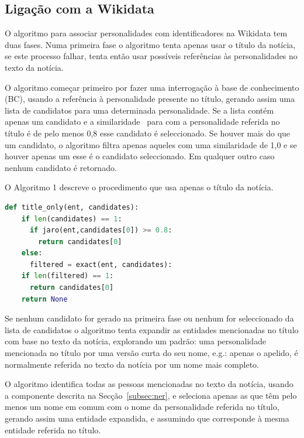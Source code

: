 \documentclass[a4paper, twocolumn, 11pt, twoside]{article}
\begin{document}
\subsection{Ligação com a Wikidata}
\label{subsec:ent_linking}

O algoritmo para associar personalidades com identificadores na Wikidata tem duas fases. Numa primeira fase o algoritmo tenta apenas usar o título da notícia, se este processo falhar, tenta então usar possíveis referências às personalidades no texto da notícia.

O algoritmo começar primeiro por fazer uma interrogação à base de conhecimento (BC), usando a referência à personalidade presente no título, gerando assim uma lista de candidatos para uma determinada personalidade. Se a lista contém apenas um candidato e a similaridade~\citep{jaro1989} para com a personalidade referida no título é de pelo menos 0,8 esse candidato é seleccionado. Se houver mais do que um candidato, o algoritmo filtra apenas aqueles com uma similaridade de 1,0 e se houver apenas um esse é o candidato seleccionado. Em qualquer outro caso nenhum candidato é retornado. 

O Algoritmo 1 descreve o procedimento que usa apenas o título da notícia.

\begin{lstlisting}[language=python,columns=fullflexible,frame=single,label={lst:alg1},title={Algoritmo 1. Ligação com a Wikidata usando apenas o título.},captionpos=b]
def title_only(ent, candidates):
    if len(candidates) == 1:
      if jaro(ent,candidates[0]) >= 0.8:
        return candidates[0]
    else:
      filtered = exact(ent, candidates):
	if len(filtered) == 1:
	  return candidates[0]
    return None
\end{lstlisting}

Se nenhum candidato for gerado na primeira fase ou nenhum for seleccionado da lista de candidatos o algoritmo tenta expandir as entidades mencionadas no título com base no texto da notícia, explorando um padrão: uma personalidade mencionada no título por uma versão curta do seu nome, e.g.: apenas o apelido, é normalmente referida no texto da notícia por um nome mais completo.

O algoritmo identifica todas as pessoas mencionadas no texto da notícia, usando a componente descrita na Secção~\ref{subsec:ner}, e seleciona apenas as que têm pelo menos um nome em comum com o nome da personalidade referida no título, gerando assim uma entidade expandida, e assumindo que corresponde à mesma entidade referida no título.
\end{document}
